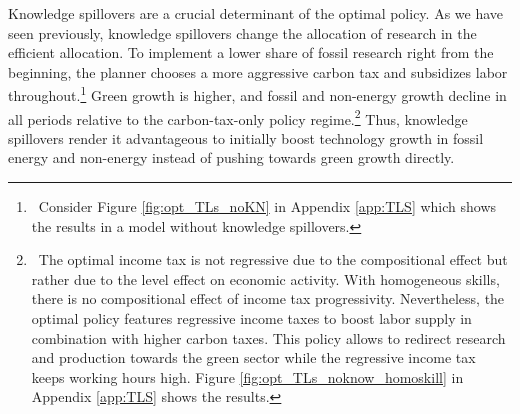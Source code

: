 \begin{figure}[h!!!]
\end{figure} 

Knowledge spillovers are a crucial determinant of the optimal policy. As we have seen previously, knowledge spillovers change the allocation of research in the efficient allocation. To implement a lower share of fossil research right from the beginning, the planner chooses a more aggressive carbon tax and subsidizes labor throughout.\footnote{\ Consider Figure \ref{fig:opt_TLs_noKN} in Appendix \ref{app:TLS} which shows the results in a model without knowledge spillovers.} Green growth is higher, and fossil and non-energy growth decline in all periods relative to the carbon-tax-only policy regime.\footnote{\  The optimal income tax is not regressive due to the compositional effect but rather due to the level effect on economic activity. With homogeneous skills, there is no compositional effect of income tax progressivity. Nevertheless, the optimal policy features regressive income taxes to boost labor supply in combination with higher carbon taxes. This policy allows to redirect research and production towards the green sector while the regressive income tax keeps working hours high. Figure \ref{fig:opt_TLs_noknow_homoskill} in Appendix \ref{app:TLS} shows the results. 
} 
Thus, knowledge spillovers render it advantageous to initially boost technology growth in fossil energy and non-energy instead of pushing towards green growth directly.







 
